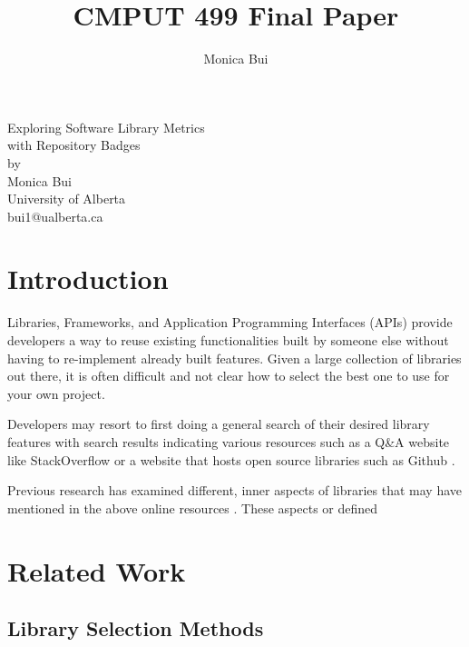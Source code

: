 \documentclass[12pt, letterpaper]{article}
\title{CMPUT 499 Final Paper}
\author{Monica Bui}
\begin{document}
\begin{titlepage}
    \centering
    \large
    \vspace{1cm}
    Exploring Software Library Metrics \\ 
    with Repository Badges \\
    \vspace{1cm}
    by \\
    \vspace{1cm}
    Monica Bui \\
    University of Alberta \\
    bui1@ualberta.ca \\
\end{titlepage}

\tableofcontents

\listoffigures
\newpage

\section{Introduction}

Libraries, Frameworks, and Application Programming Interfaces (APIs) provide developers a way to reuse existing functionalities
built by someone else without having to re-implement already built features. Given a large collection of libraries out there,
it is often difficult and not clear how to select the best one to use for your own project. 


Developers may resort to first doing a general search of their desired library features with search results indicating
various resources such as a Q\&A website like StackOverflow \cite{stackoverflow} or a website that hosts open source libraries such as Github \cite{github}.


Previous research has examined different, inner aspects of libraries that may have mentioned in the above
online resources \cite{githubbadges,apiwave,metrics,opinerarticle,analogical}. These aspects or defined 

\section{Related Work}
\subsection{Library Selection Methods}
\end{document}
